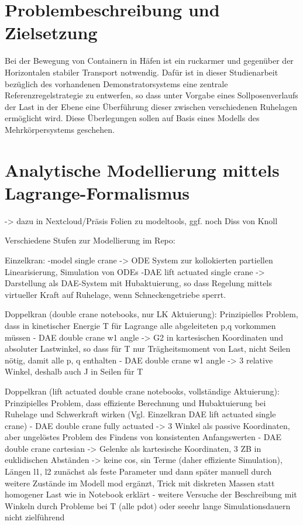 \section{Problembeschreibung und Zielsetzung}
Bei der Bewegung von Containern in Häfen ist ein ruckarmer und gegenüber der Horizontalen stabiler Transport notwendig. Dafür ist in dieser Studienarbeit bezüglich des vorhandenen Demonstratorsystems eine zentrale Referenzregelstrategie zu entwerfen, so dass unter Vorgabe eines Sollposenverlaufs der Last in der Ebene eine Überführung dieser zwischen verschiedenen Ruhelagen ermöglicht wird. Diese Überlegungen sollen auf Basis eines Modells des Mehrkörpersystems geschehen.

\section{Analytische Modellierung mittels Lagrange-Formalismus}
-> dazu in Nextcloud/Präsis Folien zu modeltools, ggf. noch Diss von Knoll

Verschiedene Stufen zur Modellierung im Repo:

Einzelkran:
-model single crane -> ODE System zur kollokierten partiellen Linearisierung, Simulation von ODEs
-DAE lift actuated single crane -> Darstellung als DAE-System mit Hubaktuierung, so dass Regelung mittels virtueller Kraft auf Ruhelage, wenn Schneckengetriebe sperrt.

Doppelkran (double crane notebooks, nur LK Aktuierung):
Prinzipielles Problem, dass in kinetischer Energie T für Lagrange alle abgeleiteten p,q vorkommen müssen
- DAE double crane w1 angle -> G2 in kartesischen Koordinaten und absoluter Lastwinkel, so dass für T nur Trägheitsmoment von Last, nicht Seilen nötig, damit alle p, q enthalten
- DAE double crane w1 angle -> 3 relative Winkel, deshalb auch J in Seilen für T

Doppelkran (lift actuated double crane notebooks, vollständige Aktuierung):
Prinzipielles Problem, dass effiziente Berechnung und Hubaktuierung bei Ruhelage und Schwerkraft wirken (Vgl. Einzelkran DAE lift actuated single crane)
- DAE double crane fully actuated -> 3 Winkel als passive Koordinaten, aber ungelöstes Problem des Findens von konsistenten Anfangswerten
- DAE double crane cartesian -> Gelenke als kartesische Koordinaten, 3 ZB in euklidischen Abständen -> keine cos, sin Terme (daher effiziente Simulation), Längen l1, l2 zunächst als feste Parameter und dann später manuell durch weitere Zustände im Modell mod ergänzt, Trick mit diskreten Massen statt homogener Last wie in Notebook erklärt
- weitere Versuche der Beschreibung mit Winkeln durch Probleme bei T (alle pdot) oder seeehr lange Simulationsdauern nicht zielführend

